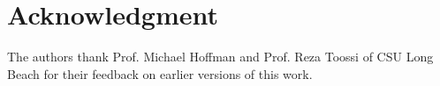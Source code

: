 \documentclass[final,journal,10pt,letterpaper,oneside,twocolumn,compsoc]%
{IEEEtran}
\begin{document}

%





\section*{Acknowledgment}


The authors thank Prof. Michael Hoffman and Prof. Reza Toossi
of CSU Long Beach for their feedback on earlier versions of this work.


\ifCLASSOPTIONcaptionsoff
  \newpage
\fi
\end{document}
